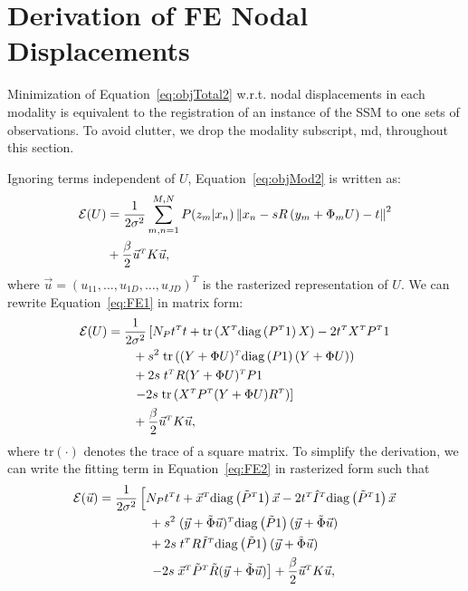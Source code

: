 \documentclass[journal]{IEEEtran}
\newcommand{\trans}[1]{#1^{\scriptscriptstyle T}}
\newcommand{\trace}{\mathrm{tr}}
\newcommand{\diag}{\mathrm{diag}}
\begin{document}
\section{Derivation of FE Nodal Displacements}\label{sec:app1}
Minimization of Equation~\ref{eq:objTotal2} w.r.t. nodal displacements in each modality is equivalent to the registration of an instance of the SSM to one sets of observations. To avoid clutter, we drop the modality subscript, $\mathrm{md}$, throughout this section.

Ignoring terms independent of $U$, Equation~\ref{eq:objMod2} is written as:
\begin{align}\label{eq:FE1}
  \mathcal{E}(U) & = \dfrac{1}{2\sigma^2}\sum_{m,n=1}^{M,N}P(z_m|x_n)\left\|x_n-sR\left(y_m+\Phi_mU\right)-t\right\|^2\notag\\
  & + \dfrac{\beta}{2}\trans{\vec{u}}K\vec{u},
\end{align}
where $\vec{u}=\trans{(u_{11},\ldots,u_{1D},\ldots,u_{JD})}$ is the rasterized representation of $U$. We can rewrite Equation~\ref{eq:FE1} in matrix form:
\begin{align}\label{eq:FE2}
    \mathcal{E}(U) & = \dfrac{1}{2\sigma^2}\left[N_P\trans{t}t + \trace\left(\trans{X}\diag\left(\trans{P}1\right)X\right)-2\trans{t}\trans{X}\trans{P}1\right.\notag\\
    & \qquad +s^2\;\trace\left(\trans{(Y+\Phi U)}\diag\left(P1\right)(Y+\Phi U)\right) \notag\\
    & \qquad + 2s\;\trans{t}R\trans{(Y+ \Phi U)}P1\notag\\
    & \qquad \left.-2s\;\trace\left(\trans{X}\trans{P}(Y+\Phi U)\trans{R}\right)\right]\notag\\
    & \qquad + \dfrac{\beta}{2}\trans{\vec{u}}K\vec{u},
\end{align}
where $\trace(\cdot)$ denotes the trace of a square matrix. To simplify the derivation, we can write the fitting term in Equation~\ref{eq:FE2} in rasterized form such that
\begin{align}\label{eq:FE3}
    \mathcal{E}(\vec{u}) & = \dfrac{1}{2\sigma^2}\left[N_P\trans{t}t + \trans{\vec{x}}\diag\left(\trans{\tilde{P}}1\right)\vec{x}-2\trans{t}\trans{\hat{I}}\diag\left(\trans{\tilde{P}}1\right)\vec{x}\right.\notag\\
    & \qquad\qquad + s^2\;\trans{(\vec{y}+\tilde{\Phi}\vec{u})}\diag\left(\tilde{P}1\right)(\vec{y}+\tilde{\Phi}\vec{u})\notag\\
    & \qquad\qquad +2s\;\trans{t}R\trans{\tilde{I}}\diag\left(\tilde{P}1\right)(\vec{y}+\tilde{\Phi}\vec{u})\notag\\
    & \qquad\qquad \left.-2s\;\trans{\vec{x}}\trans{\tilde{P}}\tilde{R}(\vec{y}+\tilde{\Phi}\vec{u})\right] + \dfrac{\beta}{2}\trans{\vec{u}}K\vec{u},
\end{align}
\end{document}
